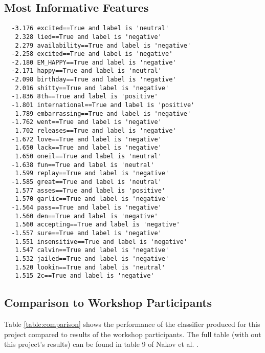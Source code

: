 \documentclass[12pt]{article}
\begin{document}
\subsection{Most Informative Features}

\begin{verbatim}
  -3.176 excited==True and label is 'neutral'
   2.328 lied==True and label is 'negative'
   2.279 availability==True and label is 'negative'
  -2.258 excited==True and label is 'negative'
  -2.180 EM_HAPPY==True and label is 'negative'
  -2.171 happy==True and label is 'neutral'
  -2.098 birthday==True and label is 'negative'
   2.016 shitty==True and label is 'negative'
  -1.836 8th==True and label is 'positive'
  -1.801 international==True and label is 'positive'
   1.789 embarrassing==True and label is 'negative'
  -1.762 went==True and label is 'negative'
   1.702 releases==True and label is 'negative'
  -1.672 love==True and label is 'negative'
   1.650 lack==True and label is 'negative'
   1.650 oneil==True and label is 'neutral'
  -1.638 fun==True and label is 'neutral'
   1.599 replay==True and label is 'negative'
  -1.585 great==True and label is 'neutral'
   1.577 asses==True and label is 'positive'
   1.570 garlic==True and label is 'negative'
  -1.564 pass==True and label is 'negative'
   1.560 den==True and label is 'negative'
   1.560 accepting==True and label is 'negative'
  -1.557 sure==True and label is 'negative'
   1.551 insensitive==True and label is 'negative'
   1.547 calvin==True and label is 'negative'
   1.532 jailed==True and label is 'negative'
   1.520 lookin==True and label is 'neutral'
   1.515 2c==True and label is 'negative'
\end{verbatim}

\subsection{Comparison to Workshop Participants}

Table \ref{table:comparison} shows the performance of the classifier produced
for this project compared to results of the workshop participants. The full
table (with out this project's results) can be found in table 9 of Nakov et al.
\cite{Nakov2013}.
\end{document}
